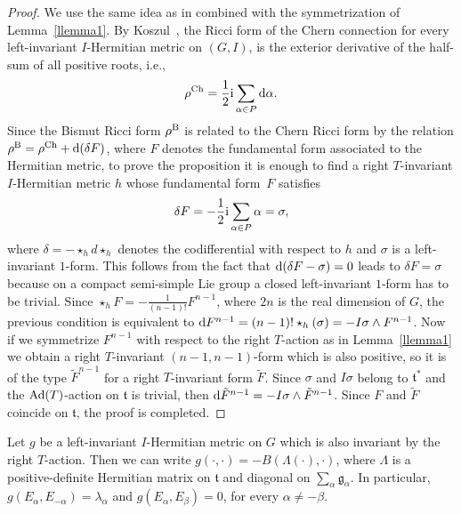 \documentclass[pdftex]{sigma}
\numberwithin{equation}{section}
\begin{document}
\begin{proof}
We use the same idea as in \cite{FG} combined with the symmetrization of Lemma~\ref{llemma1}.
By Koszul~\cite{K},
the Ricci form of the Chern connection for every left-invariant $I$-Hermitian metric on $(G, I)$, is the exterior derivative of the half-sum of all positive roots, i.e.,
\[
\rho^{\rm Ch}= \frac{1}{2} {\rm i} \sum_{\alpha \in P} {\rm d} \alpha.
\]
Since the Bismut Ricci form $\rho^{\rm B}$ is related to the Chern Ricci form by the relation $\rho^{\rm B} = \rho^{\rm Ch} + {\rm d} (\delta F)$, where $F$ denotes the fundamental form associated to the Hermitian metric, to prove the proposition it is enough to find a right $T$-invariant $I$-Hermitian metric $h$ whose fundamental form~$F$ satisfies
\[
\delta F = - \frac{1}{2} {\rm i} \sum_{\alpha \in P} \alpha = \sigma,
\]
where $\delta = - \star_h d \star_h$ denotes the codifferential with respect to $h$ and $\sigma$ is a left-invariant $1$-form. This follows from the fact that ${\rm d} (\delta F - \sigma)=0$ leads to $\delta F = \sigma$ because on a compact semi-simple Lie group a closed left-invariant $1$-form has to be trivial.
Since $ \star_h F = - \frac{1}{(n -1)!} F^{n-1}$, where $2n$ is the real dimension of $G$, the previous condition is equivalent to ${\rm d} F^{n-1} = (n -1)! \star_h (\sigma) =- I\sigma\wedge F^{n-1}$.
Now if we symmetrize $F^{n-1}$
with respect to the right $T$-action as in Lemma~\ref{llemma1} we obtain a right $T$-invariant $(n-1,n-1)$-form which is also positive, so it is of the type $\tilde{F}^{n-1}$ for a right $T$-invariant form $\tilde{F}$. Since $\sigma$ and $I \sigma$ belong to $\mathfrak t^*$ and the ${\rm Ad}(T)$-action on $\mathfrak t$ is trivial, then ${\rm d} \tilde{F}^{n-1} = -I\sigma \wedge \tilde{F}^{n-1}$.
Since $F$ and $\tilde{F}$ coincide on $\mathfrak t$, the proof is completed.
\end{proof}

Let $g$ be a left-invariant $I$-Hermitian metric on $G$ which is also invariant by the right $T$-action. Then we can write $g (\cdot, \cdot ) = -B (\Lambda (\cdot), \cdot)$, where
$\Lambda$ is a positive-definite Hermitian matrix on $\mathfrak t$ and diagonal on $\sum_{\alpha} \mathfrak g_{\alpha}$.
In particular, $g (E_{\alpha}, E_{-\alpha}) = \lambda_{\alpha}$ and $g(E_{\alpha},E_{\beta}) =0$, for every $\alpha \neq - \beta$.
\end{document}

